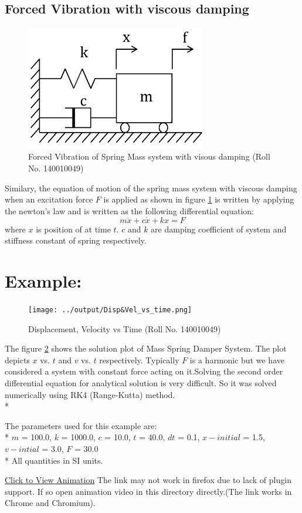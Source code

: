 \documentclass[12pt, a4paper]{article}
\begin{document}
\subsection{Forced Vibration with viscous damping}
\begin{figure}[h]
\includegraphics[width=0.7\textwidth]{Forced_damped.png}
\caption{Forced Vibration of Spring Mass system with visous damping (Roll No. 140010049)}
\label{fig:forced_damped}
\end{figure}
Similary, the equation of motion of the spring mass system with viscous damping when an excitation force $F$ is applied as shown in figure
\ref{fig:forced_damped} is written by applying the newton's law and is written as the following differential equation:\\
\begin{equation} \label{sec-ord-eq}
m\ddot{x}+c\dot{x}+kx=F
\end{equation}
where $x$ is position of at time  $t$. $c$ and $k$ are damping coefficient of system and stiffness constant of spring respectively.\\



\section{Example:}
\begin{figure}[h]
\texttt{[image: ../output/Disp\&Vel\_vs\_time.png]}
\caption{Displacement, Velocity vs Time (Roll No. 140010049)}
\label{fig:exampleplot}
\end{figure}

The figure \ref{fig:exampleplot} shows the solution plot of Mass Spring Damper System. The plot depicts $x$ vs. $t$ and $v$ vs. $t$ respectively. Typically $F$ is a harmonic but we have considered a system with constant force acting on it.Solving the second order differential equation for analytical solution is very difficult. So it  was solved numerically using RK4 (Range-Kutta) method.\\*

The parameters used for this example are:\\*
$m$ = 100.0, $k$ = 1000.0, $c$ = 10.0, $t$ = 40.0, $dt$ = 0.1, $x-initial$ = 1.5, $v-intial$ = 3.0, $F$ = 30.0\\*
All quantities in SI units.


\href{run:Animation.html}{Click to View Animation}
The link may not work in firefox due to lack of plugin support. If so open animation video in this directory directly.(The link works in Chrome and Chromium). 
\end{document}
